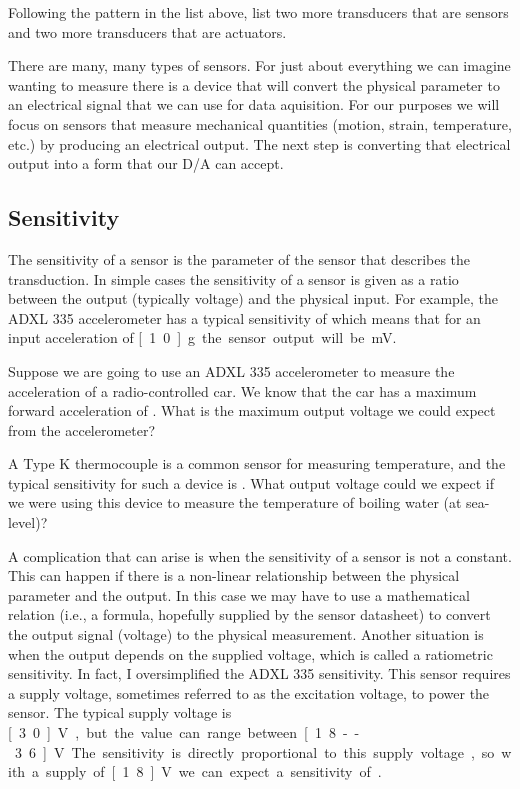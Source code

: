 \begin{ex}
Following the pattern in the list above, list two more transducers that are sensors and two more transducers that are actuators.
\end{ex}


There are many, many types of sensors.  For just about everything we can imagine wanting to measure there is a device that will convert the physical parameter to an electrical signal that we can use for data aquisition.  For our purposes we will focus on sensors that measure mechanical quantities (motion, strain, temperature, etc.) by producing an electrical output.  The next step is converting that electrical output into a form that our D/A can accept.  

\subsection{Sensitivity}
The sensitivity of a sensor is the parameter of the sensor that describes the transduction.  In simple cases the sensitivity of a sensor is given as a ratio between the output (typically voltage) and the physical input.  For example, the ADXL 335 accelerometer has a typical sensitivity of  which means that for an input acceleration of \unit[1.0]{g} the sensor output will be \unit[300]{mV}.
\begin{ex}\label{ex:asens}
Suppose we are going to use an ADXL 335 accelerometer to measure the acceleration of a radio-controlled car.  We know that the car has a maximum forward acceleration of .  What is the maximum output voltage we could expect from the accelerometer?
\end{ex}
\begin{ex}
A Type K thermocouple is a common sensor for measuring temperature, and the typical sensitivity for such a device is .  What output voltage could we expect if we were using this device to measure the temperature of boiling water (at sea-level)?
\end{ex}

A complication that can arise is when the sensitivity of a sensor is not a constant.  This can happen if there is a non-linear relationship between the physical parameter and the output.  In this case we may have to use a mathematical relation (i.e., a formula, hopefully supplied by the sensor datasheet) to convert the output signal (voltage) to the physical measurement.  Another situation is when the output depends on the supplied voltage, which is called a \gls{ratiometric} sensitivity.  In fact, I oversimplified the ADXL 335 sensitivity.  This sensor requires a supply voltage, sometimes referred to as the \gls{excitation voltage}, to power the sensor.  The typical supply voltage is \unit[3.0]{V}, but the value can range between \unit[1.8--3.6]{V}.  The sensitivity is directly proportional to this supply voltage, so with a supply of \unit[1.8]{V} we can expect a sensitivity of .  

